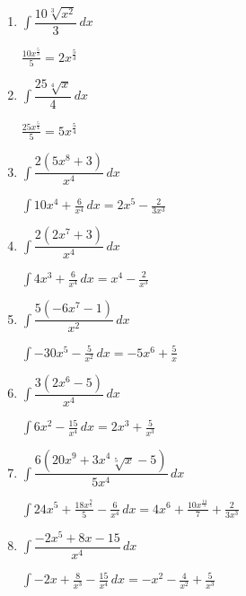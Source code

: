 \documentclass[answers]{exam}
\begin{document}
\begin{questions}
\begin{enumerate}
        \item $\displaystyle \int \dfrac{10\sqrt[3]{x^2}}{3}\, dx$
        \begin{solution}
        $\displaystyle \frac{10x^{\frac{5}{3}}}{5}  = 2x^{\frac{5}{3}} $
        \end{solution}

        \item $\displaystyle \int \dfrac{25\sqrt[4]{x}}{4}\, dx$
        \begin{solution}
        $\displaystyle \frac{25x^{\frac{5}{4}}}{5}  = 5x^{\frac{5}{4}} $
        \end{solution}

        \item $\displaystyle \int \dfrac{2(5x^8+3)}{x^4}\, dx$
        \begin{solution}
        $\displaystyle \int 10x^4 + \frac{6}{x^4} \, dx = 2x^5 - \frac{2}{3x^3} $
        \end{solution}

        \item $\displaystyle \int \dfrac{2(2x^7+3)}{x^4}\, dx$
        \begin{solution}
        $\displaystyle \int 4x^3 + \frac{6}{x^4} \, dx = x^4 - \frac{2}{x^3} $
        \end{solution}

        \item $\displaystyle \int \dfrac{5(-6x^7-1)}{x^2}\, dx$
        \begin{solution}
        $\displaystyle \int -30x^5 - \frac{5}{x^2} \, dx = -5x^6 + \frac{5}{x} $
        \end{solution}

        \item $\displaystyle \int \dfrac{3(2x^6-5)}{x^4}\, dx$
        \begin{solution}
        $\displaystyle \int 6x^2 - \frac{15}{x^4} \, dx = 2x^3 + \frac{5}{x^3} $
        \end{solution}

        \item $\displaystyle \int \dfrac{6(20x^9+3x^4\sqrt[5]{x}-5)}{5x^4}\, dx$
        \begin{solution}
        $\displaystyle \int 24x^5 + \frac{18x^{\frac{9}{5}}}{5} - \frac{6}{x^4} \, dx = 4x^6 + \frac{10x^{\frac{14}{5}}}{7} + \frac{2}{3x^3} $
        \end{solution}

        \item $\displaystyle \int \dfrac{-2x^5+8x-15}{x^4}\, dx$
        \begin{solution}
        $\displaystyle \int -2x + \frac{8}{x^3} - \frac{15}{x^4} \, dx = -x^2 - \frac{4}{x^2} + \frac{5}{x^3} $
        \end{solution}


\end{enumerate}
\end{questions}
\end{document}
